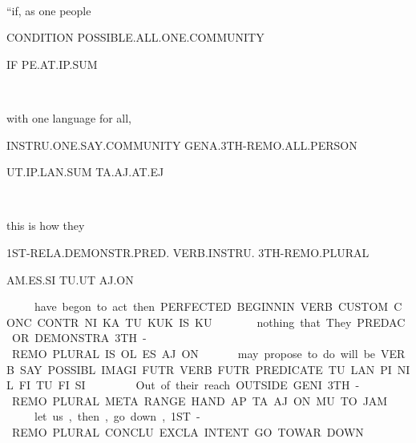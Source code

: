 {{\Atlani\an ~ \Atlano\jel~\pa\lan
\drie 

“if, 			as one people 		

CONDITION	POSSIBLE.ALL.ONE.COMMUNITY		 

IF			PE.AT.IP.SUM				 

\Atlanif~\pe\at\ip\Atlansum
\drie 

 

with one language 		for all, 

INSTRU.ONE.SAY.COMMUNITY	GENA.3TH-REMO.ALL.PERSON	 

UT.IP.LAN.SUM			TA.AJ.AT.EJ 

\ut\ip\lan\Atlansum~\ta\aj\at\ej
\drie 

 

this is 				how       	they  

1ST-RELA.DEMONSTR.PRED.	VERB.INSTRU.    3TH-REMO.PLURAL 

AM.ES.SI			TU.UT		AJ.ON 

\am\es\si~\tu\ut~\aj\on
  
\drie 

have begon 			to act		then 		 

PERFECTED.BEGINNIN.                 VERB.CUSTOM	CONC.CONTR	 

NI.KA				TU.KUK		IS.KU                     

\Atlanni\ka~\tu\kuk~\is\ku
\drie 


nothing 	that		They 	 

PREDAC.OR	DEMONSTRA.	3TH-REMO.PLURAL 

IS.OL		ES		AJ.ON	 

\is\ol~\es~\aj\on
\drie 

 

may propose			to do		will be 

VERB.SAY.POSSIBL.IMAGI	FUTR.VERB	FUTR.PREDICATE 

TU.LAN.PI.NIL		               FI.TU		FI.SI 

\tu\lan\Atlanpi\Atlannil~\Atlanfi\tu~\Atlanfi\si
\drie 

  

Out 		of their 				reach 

OUTSIDE	GENI.3TH-REMO.PLURAL	META.RANGE.HAND 

AP		TA.AJ.ON			MU.TO.JAM 

\ap~\ta\aj\on~\Atlanmu\Atlanto\jam
\drie

  

let us, then, go down, 			      	 

1ST-REMO.PLURAL CONCLU EXCLA.INTENT.GO.TOWAR.DOWN             

}}
